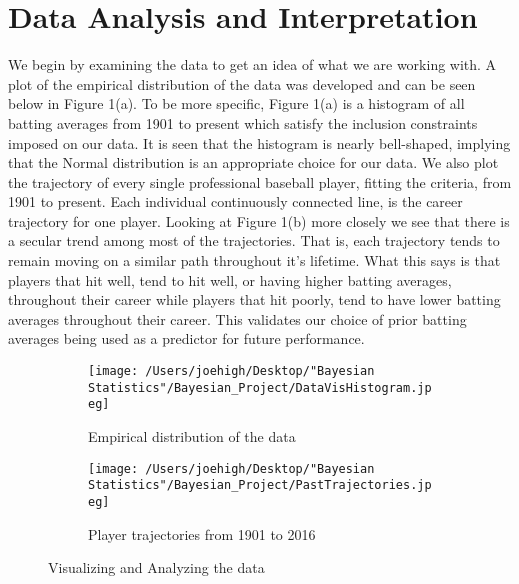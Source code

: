 \documentclass[10pt,a4paper]{article}
\begin{document}
\section*{\large Data Analysis and Interpretation}
We begin by examining the data to get an idea of what we are working with. A plot of the empirical distribution of the data was developed and can be seen below in Figure 1(a). To be more specific, Figure 1(a) is a histogram of all batting averages from 1901 to present which satisfy the inclusion constraints imposed on our data. It is seen that the histogram is nearly bell-shaped, implying that the Normal distribution is an appropriate choice for our data. We also plot the trajectory of every single professional baseball player, fitting the criteria, from 1901 to present. Each individual continuously connected line, is the career trajectory for one player. Looking at Figure 1(b) more closely we see that there is a secular trend among most of the trajectories. That is, each trajectory tends to remain moving on a similar path throughout it's lifetime. What this says is that players that hit well, tend to hit well, or having higher batting averages, throughout their career while players that hit poorly, tend to have lower batting averages throughout their career. This validates our choice of prior batting averages being used as a predictor for future performance.

\begin{figure}[H]
 
\begin{subfigure}{0.5\textwidth}
\texttt{[image: /Users/joehigh/Desktop/"Bayesian Statistics"/Bayesian\_Project/DataVisHistogram.jpeg]} 
\caption{Empirical distribution of the data}
\label{fig:subim1}
\end{subfigure}
\begin{subfigure}{0.5\textwidth}
\texttt{[image: /Users/joehigh/Desktop/"Bayesian Statistics"/Bayesian\_Project/PastTrajectories.jpeg]}
\caption{Player trajectories from 1901 to 2016}
\label{fig:subim2}
\end{subfigure}

\caption{Visualizing and Analyzing the data}
\label{fig:image2}
\end{figure} 
\end{document}
